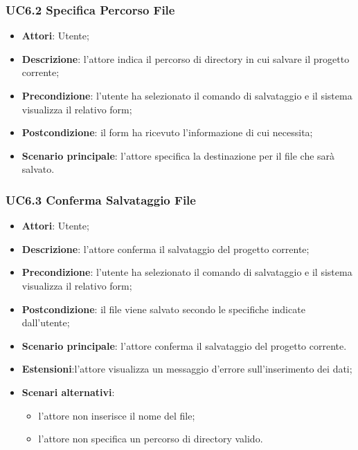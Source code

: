 \subsubsection{UC6.2 Specifica Percorso File}
\label{UC6.2}
\begin{itemize}
\item \textbf{Attori}: Utente;
\item \textbf{Descrizione}: l'attore indica il percorso di directory in cui salvare il progetto corrente;
\item \textbf{Precondizione}: l'utente ha selezionato il comando di salvataggio e il sistema visualizza il relativo form;
\item \textbf{Postcondizione}: il form ha ricevuto l'informazione di cui necessita;
\item \textbf{Scenario principale}:
l'attore specifica la destinazione per il file che sarà salvato.
\end{itemize}

\subsubsection{UC6.3 Conferma Salvataggio File}
\label{UC6.3}
\begin{itemize}
\item \textbf{Attori}: Utente;
\item \textbf{Descrizione}: l'attore conferma il salvataggio del progetto corrente;
\item \textbf{Precondizione}: l'utente ha selezionato il comando di salvataggio e il sistema visualizza il relativo form;
\item \textbf{Postcondizione}: il file viene salvato secondo le specifiche indicate dall'utente;
\item \textbf{Scenario principale}:
l'attore conferma il salvataggio del progetto corrente.
\item \textbf{Estensioni}:l'attore visualizza un messaggio d'errore sull'inserimento dei dati;
\item \textbf{Scenari alternativi}:
\begin{itemize}
\item l'attore non inserisce il nome del file;
\item l'attore non specifica un percorso di directory valido.
\end{itemize}
\end{itemize}

